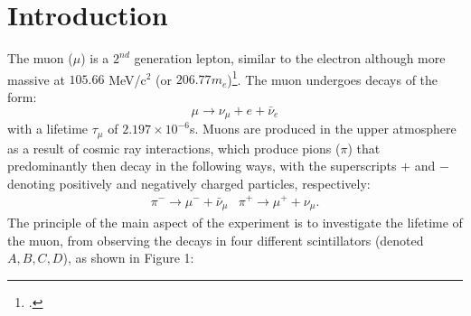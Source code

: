 \documentclass[a4paper]{article}
\begin{document}
\section{Introduction}
The muon ($\mu$) is a $2^{nd}$ generation lepton, similar to the electron although more massive at $105.66$ MeV/c$^2$ (or $206.77 m_e$)\footcite{muonmass}. The muon undergoes decays of the form:
\begin{equation*}
	\mu \rightarrow \nu_\mu +e+ \bar \nu_e
\end{equation*}
with a lifetime $\tau_\mu$ of $2.197 \times 10^{-6}$s.
Muons are produced in the upper atmosphere as a result of cosmic ray interactions, which produce pions ($\pi$) that predominantly then decay in the following ways, with the superscripts $+$ and $-$ denoting positively and negatively charged particles, respectively:
\begin{align*}
	&\pi^- \rightarrow \mu^- +\bar \nu_\mu & 
	\pi^+ \rightarrow \mu^+ +\nu_\mu.& 
\end{align*}
The principle of the main aspect of the experiment is to investigate the lifetime of the muon, from observing the decays in four different scintillators (denoted $A,B,C,D$), as shown in Figure 1:
\end{document}
